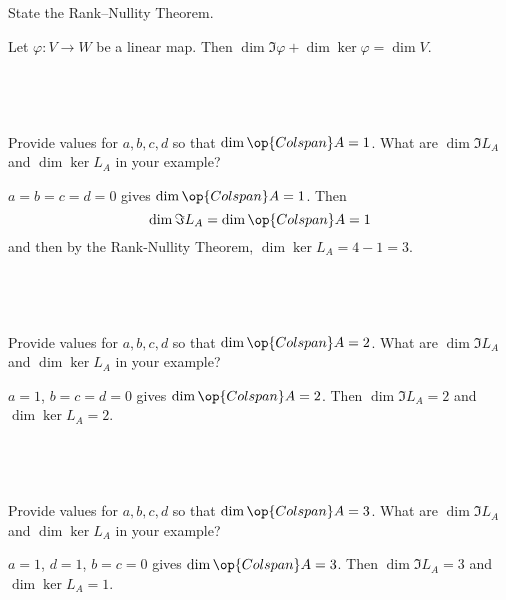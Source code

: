 \documentclass[a4paper]{article}
\begin{document}
\subsection{~} %

\begin{questionbody}
State the Rank--Nullity Theorem.
\end{questionbody}

Let $\varphi : V \to W$ be a linear map. Then $\dim \Im \varphi + \dim \ker \varphi = \dim V$.

\subsection{~} %

\begin{questionbody}
Provide values for $a, b, c, d$ so that $\dim \op{Colspan} A = 1$. What are $\dim \Im L_A$ and $\dim \ker L_A$ in your example?
\end{questionbody}

$a = b = c = d = 0$ gives $\dim \op{Colspan} A = 1$. Then $$\dim \Im L_A = \dim \op{Colspan} A = 1$$
and then by the Rank-Nullity Theorem, $\dim \ker L_A = 4 - 1 = 3$.

\subsection{~} %

\begin{questionbody}
Provide values for $a, b, c, d$ so that $\dim \op{Colspan} A = 2$. What are $\dim \Im L_A$ and $\dim \ker L_A$ in your example?
\end{questionbody}

$a = 1$, $b = c = d = 0$ gives $\dim \op{Colspan} A = 2$. Then $\dim \Im L_A = 2$ and $\dim \ker L_A = 2$.

\subsection{~} %

\begin{questionbody}
Provide values for $a, b, c, d$ so that $\dim \op{Colspan} A = 3$. What are $\dim \Im L_A$ and $\dim \ker L_A$ in your example?
\end{questionbody}

$a = 1$, $d = 1$, $b = c = 0$ gives $\dim \op{Colspan} A = 3$. Then $\dim \Im L_A = 3$ and $\dim \ker L_A = 1$.

\end{document}
